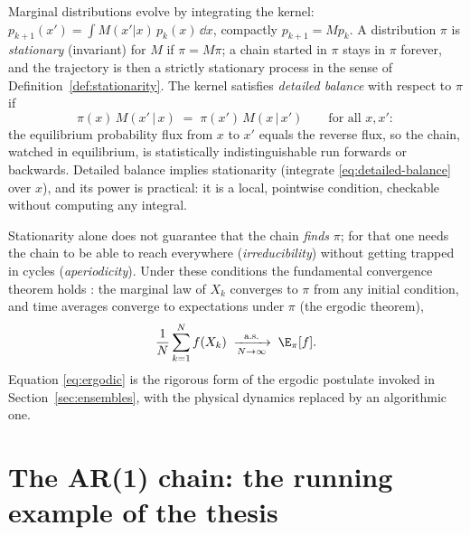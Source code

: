 Marginal distributions evolve by integrating the kernel:
$p_{k+1}(x') = \int M(x'|x)\, p_k(x)\,\dd x$, compactly
$p_{k+1} = M p_k$. A distribution $\pi$ is \emph{stationary} (invariant)
for $M$ if $\pi = M\pi$; a chain started in $\pi$ stays in $\pi$ forever,
and the trajectory is then a strictly stationary process in the sense of
Definition~\ref{def:stationarity}. The kernel satisfies \emph{detailed
balance} with respect to $\pi$ if
\begin{equation}
  \pi(x)\, M(x' \,|\, x) \;=\; \pi(x')\, M(x \,|\, x')
  \qquad \text{for all } x, x' :
  \label{eq:detailed-balance}
\end{equation}
the equilibrium probability flux from $x$ to $x'$ equals the reverse
flux, so the chain, watched in equilibrium, is statistically
indistinguishable run forwards or backwards. Detailed balance implies
stationarity (integrate \eqref{eq:detailed-balance} over $x$), and its
power is practical: it is a local, pointwise condition, checkable without
computing any integral.

Stationarity alone does not guarantee that the chain \emph{finds} $\pi$;
for that one needs the chain to be able to reach everywhere
(\emph{irreducibility}) without getting trapped in cycles
(\emph{aperiodicity}). Under these conditions the fundamental convergence
theorem holds \citep{robert2004monte}: the marginal law of $X_k$
converges to $\pi$ from any initial condition, and time averages converge
to expectations under $\pi$ (the ergodic theorem),
\begin{equation}
  \frac{1}{N} \sum_{k=1}^{N} f(X_k)
  \;\xrightarrow[N \to \infty]{\text{a.s.}}\;
  \E_\pi[f] .
  \label{eq:ergodic}
\end{equation}
Equation \eqref{eq:ergodic} is the rigorous form of the ergodic postulate
invoked in Section~\ref{sec:ensembles}, with the physical dynamics
replaced by an algorithmic one.

\section{The AR(1) chain: the running example of the thesis}\label{sec:ar1}

